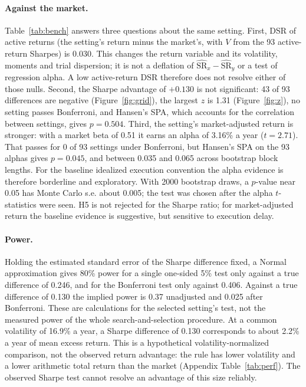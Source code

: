 \documentclass[11pt,a4paper]{article}
\newcommand{\hSR}{\widehat{\mathrm{SR}}}
\begin{document}
\paragraph{Against the market.} Table~\ref{tab:bench} answers three questions about the same setting. First, DSR of active returns (the setting's return minus the market's, with $V$ from the 93 active-return Sharpes) is 0.030. This changes the return variable and its volatility, moments and trial dispersion; it is not a deflation of $\hSR_x-\hSR_y$ or a test of regression alpha. A low active-return DSR therefore does not resolve either of those nulls. Second, the Sharpe advantage of $+0.130$ is not significant: 43 of 93 differences are negative (Figure~\ref{fig:grid}), the largest $z$ is 1.31 (Figure~\ref{fig:z}), no setting passes Bonferroni, and Hansen's SPA, which accounts for the correlation between settings, gives $p=0.504$. Third, the setting's market-adjusted return is stronger: with a market beta of 0.51 it earns an alpha of 3.16\% a year ($t=2.71$). That passes for 0 of 93 settings under Bonferroni, but Hansen's SPA on the 93 alphas gives $p=0.045$, and between 0.035 and 0.065 across bootstrap block lengths. For the baseline idealized execution convention the alpha evidence is therefore borderline and exploratory. With 2000 bootstrap draws, a $p$-value near 0.05 has Monte Carlo s.e. about 0.005; the test was chosen after the alpha $t$-statistics were seen. H5 is not rejected for the Sharpe ratio; for market-adjusted return the baseline evidence is suggestive, but sensitive to execution delay.

\paragraph{Power.} Holding the estimated standard error of the Sharpe difference fixed, a Normal approximation gives 80\% power for a single one-sided 5\% test only against a true difference of 0.246, and for the Bonferroni test only against 0.406. Against a true difference of 0.130 the implied power is 0.37 unadjusted and 0.025 after Bonferroni. These are calculations for the selected setting's test, not the measured power of the whole search-and-selection procedure. At a common volatility of 16.9\% a year, a Sharpe difference of 0.130 corresponds to about 2.2\% a year of mean excess return. This is a hypothetical volatility-normalized comparison, not the observed return advantage: the rule has lower volatility and a lower arithmetic total return than the market (Appendix Table~\ref{tab:perf}). The observed Sharpe test cannot resolve an advantage of this size reliably.
\end{document}
